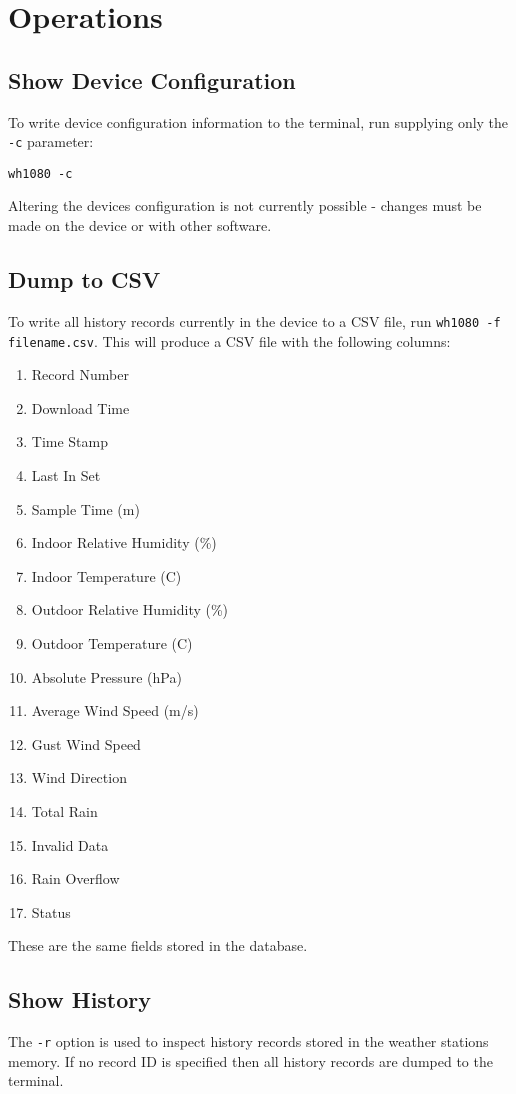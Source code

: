 \documentclass[a4paper,10pt,draft]{book}
\begin{document}
\section{Operations}
\subsection{Show Device Configuration}
To write device configuration information to the terminal, run supplying only the \verb|-c| parameter:

\verb|wh1080 -c|

Altering the devices configuration is not currently possible - changes must be made on the device or with other software.

\subsection{Dump to CSV}
To write all history records currently in the device to a CSV file, run
\verb|wh1080 -f filename.csv|. This will produce a CSV file with the following columns:
\begin{enumerate}
\item Record Number
\item Download Time
\item Time Stamp
\item Last In Set
\item Sample Time (m)
\item Indoor Relative Humidity (\%)
\item Indoor Temperature (C)
\item Outdoor Relative Humidity (\%)
\item Outdoor Temperature (C)
\item Absolute Pressure (hPa)
\item Average Wind Speed (m/s)
\item Gust Wind Speed
\item Wind Direction
\item Total Rain
\item Invalid Data
\item Rain Overflow
\item Status
\end{enumerate}

These are the same fields stored in the database.

\subsection{Show History}
The \verb|-r| option is used to inspect history records stored in the weather stations memory. If no record ID is specified then all history records are dumped to the terminal.
\end{document}
